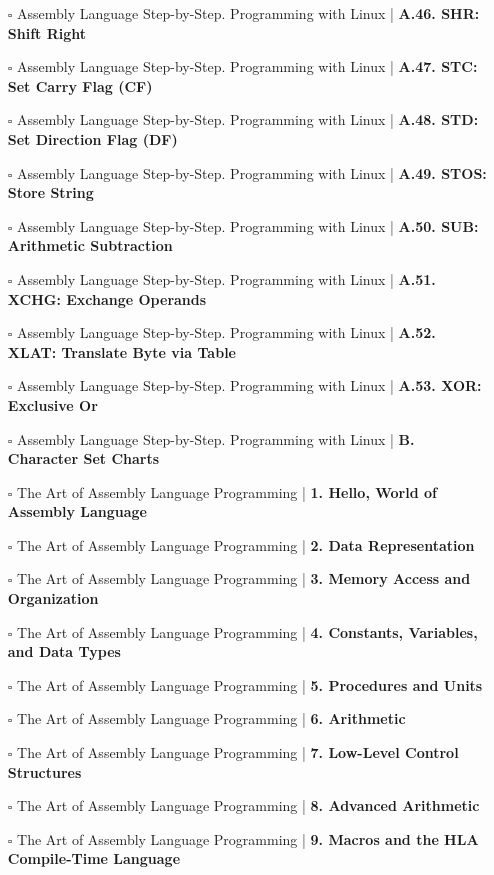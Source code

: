 \documentclass[a4, landscape, 12pt]{article}
\newcommand{\checkbox}{$\square$}%
\begin{document}
\begin{itemize}
{}
\item [\checkbox]  Assembly Language Step-by-Step. Programming with Linux | \textbf{ A.46. SHR: Shift Right
}
\item [\checkbox]  Assembly Language Step-by-Step. Programming with Linux | \textbf{ A.47. STC: Set Carry Flag (CF)
}
\item [\checkbox]  Assembly Language Step-by-Step. Programming with Linux | \textbf{ A.48. STD: Set Direction Flag (DF)
}
\item [\checkbox]  Assembly Language Step-by-Step. Programming with Linux | \textbf{ A.49. STOS: Store String
}
\item [\checkbox]  Assembly Language Step-by-Step. Programming with Linux | \textbf{ A.50. SUB: Arithmetic Subtraction
}
\item [\checkbox]  Assembly Language Step-by-Step. Programming with Linux | \textbf{ A.51. XCHG: Exchange Operands
}
\item [\checkbox]  Assembly Language Step-by-Step. Programming with Linux | \textbf{ A.52. XLAT: Translate Byte via Table
}
\item [\checkbox]  Assembly Language Step-by-Step. Programming with Linux | \textbf{ A.53. XOR: Exclusive Or
}
\item [\checkbox]  Assembly Language Step-by-Step. Programming with Linux | \textbf{ B. Character Set Charts
}
\item [\checkbox]  The Art of Assembly Language Programming | \textbf{ 1. Hello, World of Assembly Language
}
\item [\checkbox]  The Art of Assembly Language Programming | \textbf{ 2. Data Representation
}
\item [\checkbox]  The Art of Assembly Language Programming | \textbf{ 3. Memory Access and Organization
}
\item [\checkbox]  The Art of Assembly Language Programming | \textbf{ 4. Constants, Variables, and Data Types
}
\item [\checkbox]  The Art of Assembly Language Programming | \textbf{ 5. Procedures and Units
}
\item [\checkbox]  The Art of Assembly Language Programming | \textbf{ 6. Arithmetic
}
\item [\checkbox]  The Art of Assembly Language Programming | \textbf{ 7. Low-Level Control Structures
}
\item [\checkbox]  The Art of Assembly Language Programming | \textbf{ 8. Advanced Arithmetic
}
\item [\checkbox]  The Art of Assembly Language Programming | \textbf{ 9. Macros and the HLA Compile-Time Language
}
\end{itemize}
\end{document}
